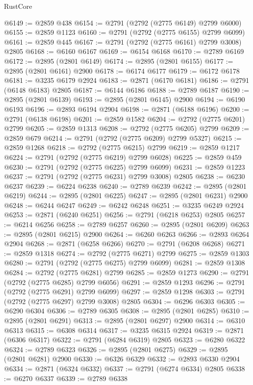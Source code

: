 \begin{lexlean}{RustCore}
\begin{coremodule}
@6149 := @2859 @438
@6154 := @2791 (@2792 (@2775 @6149) @2799 @6000)
@6155 := @2859 @1123
@6160 := @2791 (@2792 (@2775 @6155) @2799 @6099)
@6161 := @2859 @445
@6167 := @2791 (@2792 (@2775 @6161) @2799 @3008) @2805
@6168 := @6160 @6167
@6169 := @6154 @6168
@6170 := @2789 @6169
@6172 := @2895 (@2801 @6149)
@6174 := @2895 (@2801 @6155)
@6177 := @2895 (@2801 @6161) @2900
@6178 := @6174 @6177
@6179 := @6172 @6178
@6181 := @3235 @6179 @2924
@6183 := @2871 (@6170 @6181)
@6186 := @2791 (@6148 @6183) @2805
@6187 := @6144 @6186
@6188 := @2789 @6187
@6190 := @2895 (@2801 @6139)
@6193 := @2895 (@2801 @6145) @2900
@6194 := @6190 @6193
@6196 := @2893 @6194 @2904
@6198 := @2871 (@6188 @6196)
@6200 := @2791 (@6138 @6198)
@6201 := @2859 @1582
@6204 := @2792 (@2775 @6201) @2799
@6205 := @2859 @1313
@6208 := @2792 (@2775 @6205) @2799
@6209 := @2859 @679
@6214 := @2791 (@2792 (@2775 @6209) @2799 @5327)
@6215 := @2859 @1268
@6218 := @2792 (@2775 @6215) @2799
@6219 := @2859 @1217
@6224 := @2791 (@2792 (@2775 @6219) @2799 @6028)
@6225 := @2859 @459
@6230 := @2791 (@2792 (@2775 @6225) @2799 @6099)
@6231 := @2859 @1223
@6237 := @2791 (@2792 (@2775 @6231) @2799 @3008) @2805
@6238 := @6230 @6237
@6239 := @6224 @6238
@6240 := @2789 @6239
@6242 := @2895 (@2801 @6219)
@6244 := @2895 (@2801 @6225)
@6247 := @2895 (@2801 @6231) @2900
@6248 := @6244 @6247
@6249 := @6242 @6248
@6251 := @3235 @6249 @2924
@6253 := @2871 (@6240 @6251)
@6256 := @2791 (@6218 @6253) @2805
@6257 := @6214 @6256
@6258 := @2789 @6257
@6260 := @2895 (@2801 @6209)
@6263 := @2895 (@2801 @6215) @2900
@6264 := @6260 @6263
@6266 := @2893 @6264 @2904
@6268 := @2871 (@6258 @6266)
@6270 := @2791 (@6208 @6268)
@6271 := @2859 @1318
@6274 := @2792 (@2775 @6271) @2799
@6275 := @2859 @1303
@6280 := @2791 (@2792 (@2775 @6275) @2799 @6099)
@6281 := @2859 @1308
@6284 := @2792 (@2775 @6281) @2799
@6285 := @2859 @1273
@6290 := @2791 (@2792 (@2775 @6285) @2799 @6056)
@6291 := @2859 @1293
@6296 := @2791 (@2792 (@2775 @6291) @2799 @6099)
@6297 := @2859 @1298
@6303 := @2791 (@2792 (@2775 @6297) @2799 @3008) @2805
@6304 := @6296 @6303
@6305 := @6290 @6304
@6306 := @2789 @6305
@6308 := @2895 (@2801 @6285)
@6310 := @2895 (@2801 @6291)
@6313 := @2895 (@2801 @6297) @2900
@6314 := @6310 @6313
@6315 := @6308 @6314
@6317 := @3235 @6315 @2924
@6319 := @2871 (@6306 @6317)
@6322 := @2791 (@6284 @6319) @2805
@6323 := @6280 @6322
@6324 := @2789 @6323
@6326 := @2895 (@2801 @6275)
@6329 := @2895 (@2801 @6281) @2900
@6330 := @6326 @6329
@6332 := @2893 @6330 @2904
@6334 := @2871 (@6324 @6332)
@6337 := @2791 (@6274 @6334) @2805
@6338 := @6270 @6337
@6339 := @2789 @6338

\end{coremodule}
\end{lexlean}
